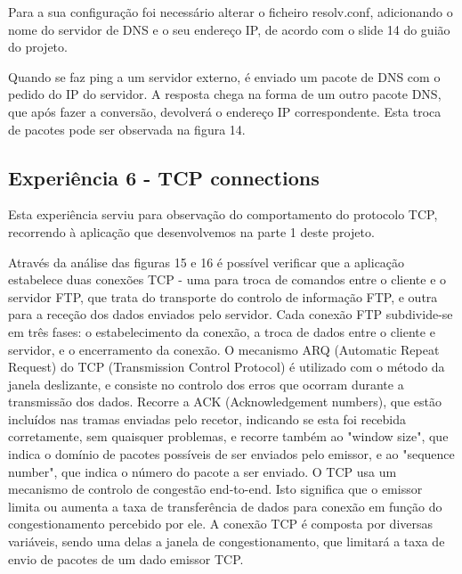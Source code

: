 \documentclass[article, a4paper, 11pt, oneside]{memoir}
\begin{document}
Para a sua configuração foi necessário alterar o ficheiro resolv.conf, adicionando o nome do servidor de DNS e o seu endereço IP, de acordo com o slide 14 do guião do projeto.

Quando se faz ping a um servidor externo, é enviado um pacote de DNS com o pedido do IP do servidor. A resposta chega na forma de um outro pacote DNS, que após fazer a conversão, 
devolverá o endereço IP correspondente.
Esta troca de pacotes pode ser observada na figura 14.

\subsection{Experiência 6 - TCP connections}

Esta experiência serviu para observação do comportamento do protocolo TCP, 
recorrendo à aplicação que desenvolvemos na parte 1 deste projeto. 

Através da análise das figuras 15 e 16 é possível verificar que a aplicação estabelece duas conexões TCP - uma para troca de comandos entre o cliente e o servidor FTP, 
que trata do transporte do controlo de informação FTP, e outra para a receção dos dados enviados pelo servidor.
Cada conexão FTP subdivide-se em três fases: o estabelecimento da conexão, a troca de dados entre o cliente e servidor, e o encerramento da conexão.
O mecanismo ARQ (Automatic Repeat Request) do TCP (Transmission Control Protocol) é utilizado com o método da janela deslizante, e consiste no controlo dos erros que ocorram durante a transmissão dos dados.
Recorre a ACK (Acknowledgement numbers), que estão incluídos nas tramas enviadas pelo recetor, indicando se esta foi recebida corretamente, sem quaisquer problemas, e recorre também ao "window size", que indica o domínio de pacotes possíveis de ser enviados pelo emissor, e ao "sequence number", que indica o número do pacote a ser enviado.
O TCP usa um mecanismo de controlo de congestão end-to-end. Isto significa que o emissor limita ou aumenta a taxa de transferência de dados para conexão em função do congestionamento percebido por ele.
A conexão TCP é composta por diversas variáveis, sendo uma delas a janela de congestionamento, que limitará a taxa de envio de pacotes de um dado emissor TCP.
\end{document}
